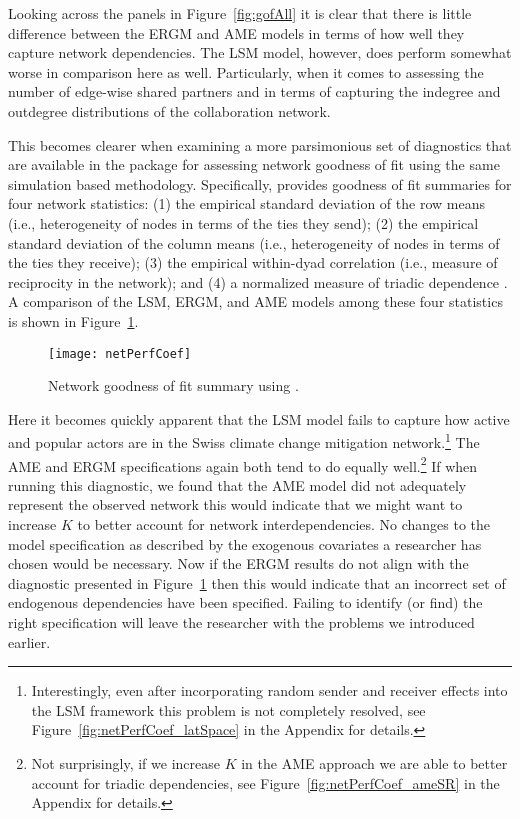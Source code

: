 Looking across the panels in Figure~\ref{fig:gofAll} it is clear that there is little difference between the ERGM and AME models in terms of how well they capture network dependencies. The LSM model, however, does perform somewhat worse in comparison here as well. Particularly, when it comes to assessing the number of edge-wise shared partners and in terms of capturing the indegree and outdegree distributions of the collaboration network. 

This becomes clearer when examining a more parsimonious set of diagnostics that are available in the  package for assessing network goodness of fit using the same simulation based methodology. Specifically,  provides goodness of fit summaries for four network statistics: (1) the empirical standard deviation of the row means (i.e., heterogeneity of nodes in terms of the ties they send); (2) the empirical standard deviation of the column means (i.e., heterogeneity of nodes in terms of the ties they receive); (3) the empirical within-dyad correlation (i.e., measure of reciprocity in the network); and (4) a normalized measure of triadic dependence \citep{hoff:etal:2015}. A comparison of the LSM, ERGM, and AME models among these four statistics is shown in Figure~\ref{fig:ergmAmePerf}.

\begin{figure}[ht]
	\centering
	\texttt{[image: netPerfCoef]}
	\caption{Network goodness of fit summary using .}
	\label{fig:ergmAmePerf}
\end{figure}
\FloatBarrier

Here it becomes quickly apparent that the LSM model fails to capture how active and popular actors are in the Swiss climate change mitigation network.\footnote{Interestingly, even after incorporating random sender and receiver effects into the LSM framework this problem is not completely resolved, see Figure~\ref{fig:netPerfCoef_latSpace} in the Appendix for details.} The AME and ERGM specifications again both tend to do equally well.\footnote{Not surprisingly, if we increase $K$ in the AME approach we are able to better account for triadic dependencies, see Figure~\ref{fig:netPerfCoef_ameSR} in the Appendix for details.} If when running this diagnostic, we found that the AME model did not adequately represent the observed network this would indicate that we might want to increase $K$ to better account for network interdependencies. No changes to the model specification as described by the exogenous covariates a researcher has chosen would be necessary. Now if the ERGM results do not align with the diagnostic presented in Figure~\ref{fig:ergmAmePerf} then this would indicate that an incorrect set of endogenous dependencies have been specified. Failing to identify (or find) the right specification will leave the researcher with the problems we introduced earlier.

